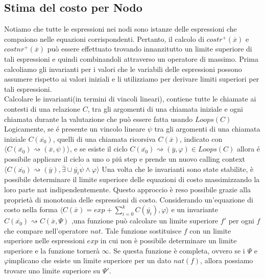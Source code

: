 \documentclass[../../main.tex]{subfiles}
\begin{document}
\subsection{Stima del costo per Nodo}
Notiamo che tutte le espressioni nei nodi sono istanze delle espressioni che compaiono nelle equazioni corrispondenti. Pertanto, il calcolo di $costr^+(\overline{x})$ e $costnr^+(\overline{x})$ può essere effettuato trovando innanzitutto un limite superiore di tali espressioni e quindi combinandoli attraverso un operatore di massimo. Prima calcoliamo gli invarianti per i valori che le variabili delle espressioni possono assumere rispetto ai valori iniziali e li utilizziamo per derivare limiti superiori per tali espressioni.\\
Calcolare le invarianti(in termini di vincoli lineari), contiene tutte le chiamate ai contesti di una relazione $C$, tra gli argomenti di una chiamata iniziale e ogni chiamata durante la valutazione che può essere fatta usando $Loops(C)$
Logicamente, se é presente un vincolo lineare $\psi$ tra gli argomenti di una chiamata iniziale $C(\overline{x_0})$, quelli di una chiamata ricorsiva $C(\overline{x})$, indicato con $\langle C(\overline{x_0})\rightsquigarrow  (\overline{x}, \psi)\rangle$, e se esiste il ciclo $C(\overline{x_0}) \rightsquigarrow (\overline{y},\varphi)\in Loops(C)$ allora é possibile applicare il ciclo a uno o piú step e prende un nuovo calling context $\langle C(\overline{x_0})  \rightsquigarrow (\overline{y}), \overline{\exists} \cup \overline{y_i}\dot \psi \land \varphi\rangle$
Una volta che le invarianti sono state stabilite, è possibile determinare il limite superiore delle equazioni di costo massimizzando la loro parte nat indipendentemente. Questo approccio è reso possibile grazie alla proprietà di monotonia delle espressioni di costo. Considerando un'equazione di costo nella forma $\langle  C(\overline{x}) = exp + \sum_{i=0}^k C(\overline{y_i}), \varphi \rangle$ e un invariante $C(\overline{x_0})\rightsquigarrow C(\overline{x}, \varPsi) $ ,una funzione può calcolare un limite superiore $f'$ per ogni $f$ che compare nell'operatore $nat$. Tale funzione sostituisce $f$ con un limite superiore nelle espressioni $exp$ in cui non è possibile determinare un limite superiore e la funzione tornerà $\infty$. Se questa funzione è completa, ovvero se i $\varPsi$ e $\varphi$implicano che esiste un limite superiore per un dato $nat(f)$, allora possiamo trovare uno limite superiore su $\varPsi '$.\\
\autocite{albert2008automatic}\autocite{amslaurea3135}
\end{document}

